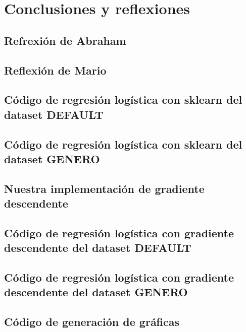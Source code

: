 \documentclass[sigconf,authorversion,nonacm]{acmart}
\begin{document}
\section{Conclusiones y reflexiones}

\subsection{Refrexión de Abraham}

\subsection{Reflexión de Mario}




\clearpage

\appendix

\lstset{style=customstyle}

\begin{figure*}
  \section{Código de regresión logística con sklearn del dataset DEFAULT}
  
\end{figure*}

\begin{figure*}
  \section{Código de regresión logística con sklearn del dataset GENERO}
  
\end{figure*}

\begin{figure*}
  \section{Nuestra implementación de gradiente descendente}
  
\end{figure*}

\begin{figure*}
  \section{Código de regresión logística con gradiente descendente del dataset DEFAULT}
  
\end{figure*}

\begin{figure*}
  \section{Código de regresión logística con gradiente descendente del dataset GENERO}
  
\end{figure*}

\begin{figure*}
  \section{Código de generación de gráficas}
  
\end{figure*}
\end{document}

